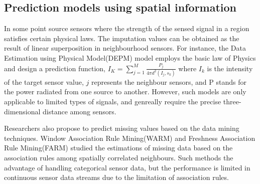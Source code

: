 \subsection{Prediction models using spatial information}
In some point source sensors where the strength of the sensed signal in a region satisfies certain physical laws. The imputation values can be obtained as the result of linear superposition in neighbourhood sensors. 
For instance, the Data Estimation using Physical Model(DEPM)\cite{li2008data} model employs the basic law of Physics and design a prediction function,  
$I_K =\sum_{j=1}^M\frac{P_j}{4\pi d^2(I_j,s_k)}$
where $I_k$ is the intensity of the target sensor value, $j$ represents the neighbour sensors, and P stands for the power radiated from one source to another. 
However, such models are only applicable to limited types of signals, and genreally require the precise three-dimensional distance among sensors.

Researchers also propose to predict missing values based on the data mining techniques. Window Association Rule Mining(WARM)\cite{le2005estimating} and Freshness Association Rule Mining(FARM)\cite{Gruenwald:FARM} studied the estimations of missing data based on the association rules among spatially correlated neighbours. 
Such methods the advantage of handling categorical sensor data, but the performance is limited in continuous sensor data streams due to the limitation of association rules. 

